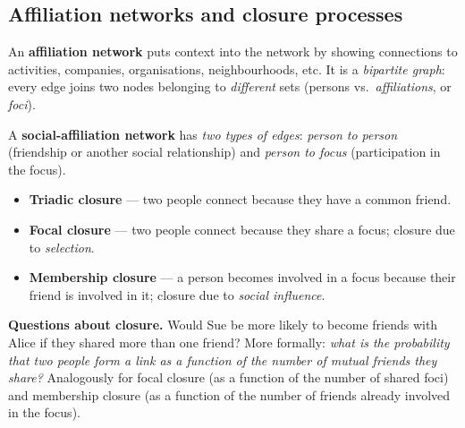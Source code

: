 \documentclass[11pt,a4paper]{article}
\theoremstyle{definition}
\begin{document}
\subsection{Affiliation networks and closure processes}

\begin{defbox}
An \textbf{affiliation network} puts context into the network by showing connections to activities,
companies, organisations, neighbourhoods, etc. It is a \emph{bipartite graph}: every edge joins two
nodes belonging to \emph{different} sets (persons vs.\ \emph{affiliations}, or \emph{foci}).

A \textbf{social-affiliation network} has \emph{two types of edges}: \emph{person to person}
(friendship or another social relationship) and \emph{person to focus} (participation in the focus).
\end{defbox}

\begin{defbox}
\begin{itemize}
\item \textbf{Triadic closure} --- two people connect because they have a common friend.
\item \textbf{Focal closure} --- two people connect because they share a focus; closure due to
      \emph{selection}.
\item \textbf{Membership closure} --- a person becomes involved in a focus because their friend is
      involved in it; closure due to \emph{social influence}.
\end{itemize}
\end{defbox}

\textbf{Questions about closure.} Would Sue be more likely to become friends with Alice if they shared
more than one friend? More formally: \emph{what is the probability that two people form a link as a
function of the number of mutual friends they share?} Analogously for focal closure (as a function of
the number of shared foci) and membership closure (as a function of the number of friends already
involved in the focus).
\end{document}
